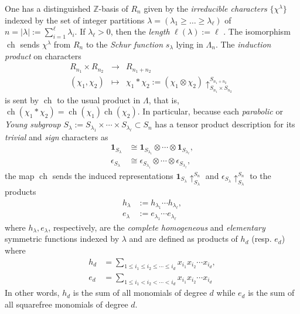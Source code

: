 \documentclass[12pt]{amsart}
\theoremstyle{plain}
\theoremstyle{definition}
\begin{document}
One has a distinguished ${{\mathbb{Z}}}$-basis of $R_n$
given by the {\it irreducible characters} 
$\{ \chi^{\lambda} \}$ indexed by the set of
integer partitions 
$\lambda=(\lambda_1 \geq \ldots \geq \lambda_\ell)$ of 
$n=|\lambda|:=\sum_{i=1}^{\ell} \lambda_i$.
If $\lambda_\ell > 0$, then the {\it length}  $\ell(\lambda):=\ell$ .
The isomorphism ${{\operatorname{ch}}}$ 
sends $\chi^{\lambda}$ from $R_n$ 
to the {\it Schur function} $s_\lambda$ lying in
$\Lambda_n$.  The {\it induction product} on characters
$$
\begin{array}{rcl}
R_{n_1} \times R_{n_2} &\longrightarrow & R_{n_1+n_2} \\
(\chi_1,\chi_2) & \longmapsto & 
\chi_1 * \chi_2:=\left( \chi_1 \otimes \chi_2 \right)
\uparrow_{S_{n_1} \times S_{n_2}}^{S_{n_1+n_2}}
\end{array}
$$
is sent by ${{\operatorname{ch}}}$ to the usual product in $\Lambda$, that is, ${{\operatorname{ch}}}(\chi_1 * \chi_2)={{\operatorname{ch}}}(\chi_1) {{\operatorname{ch}}}(\chi_2)$.  In particular, because each
{\it parabolic} or {\it Young subgroup}
$
S_{\lambda}:=S_{\lambda_1} \times \cdots \times S_{\lambda_\ell} \subset S_n
$
has a tensor product description for its {\it trivial} and {\it sign} characters as
$$
\begin{aligned}
{{\mathbf{1}}}_{S_\lambda} & \cong 
 {{\mathbf{1}}}_{S_{\lambda_1}} \otimes \cdots \otimes {{\mathbf{1}}}_{S_{\lambda_\ell}}, \\
\epsilon_{S_\lambda} & \cong 
 \epsilon_{S_{\lambda_1}} \otimes \cdots \otimes \epsilon_{S_{\lambda_\ell}}, 
\end{aligned}
$$
the map ${{\operatorname{ch}}}$ sends the induced representations 
${{\mathbf{1}}}_{S_\lambda}\uparrow_{S_\lambda}^{S_n}$ and 
$\epsilon_{S_\lambda}\uparrow_{S_\lambda}^{S_n}$ 
to the products 
$$
\begin{aligned}
h_\lambda&:=h_{\lambda_1} \cdots h_{\lambda_\ell},\\
e_\lambda&:=e_{\lambda_1} \cdots e_{\lambda_\ell}
\end{aligned}
$$
where $h_{\lambda } , e_{\lambda }$, respectively, 
are the {\it complete homogeneous} and {\it elementary}
symmetric functions indexed by $\lambda $ and are defined as products of $h_d$ (resp. $e_d$) 
where 
$$
\begin{aligned}
h_d &= \sum_{1\le i_1 \le i_2 \le \cdots \le i_d} 
            x_{i_1}x_{i_2}\cdots x_{i_d},\\
e_d &= \sum_{1 \le i_1 < i_2 < \cdots < i_d } x_{i_1}x_{i_2} \cdots x_{i_d}
\end{aligned}
$$
In other words, $h_d$ is the sum of all monomials of degree $d$ while $e_d$ is the sum of all squarefree monomials of degree $d$.   
\end{document}
